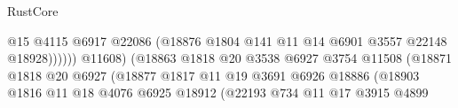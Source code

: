 \begin{lexlean}{RustCore}
\begin{coremodule}
                                                        @15
                                                        @4115
                                                        @6917
                                                        @22086
                                                        (@18876
                                                          @1804
                                                          @141
                                                          @11
                                                          @14
                                                          @6901
                                                          @3557
                                                          @22148
                                                          @18928))))))
                                              @11608)
                                            (@18863
                                              @1818
                                              @20
                                              @3538
                                              @6927
                                              @3754
                                              @11508
                                              (@18871
                                                @1818
                                                @20
                                                @6927
                                                (@18877
                                                  @1817
                                                  @11
                                                  @19
                                                  @3691
                                                  @6926
                                                  @18886
                                                  (@18903
                                                    @1816
                                                    @11
                                                    @18
                                                    @4076
                                                    @6925
                                                    @18912
                                                    (@22193
                                                      @734
                                                      @11
                                                      @17
                                                      @3915
                                                      @4899

\end{coremodule}
\end{lexlean}
